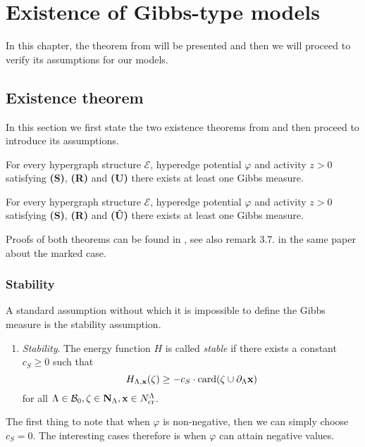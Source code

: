 \chapter{Existence of Gibbs-type models}\label{ch:3}
In this chapter, the theorem from \cite{DDG12} will be presented and then we will proceed to verify its assumptions for our models.

\section{Existence theorem}
In this section we first state the two existence theorems from \cite{DDG12} and then proceed to introduce its assumptions.

\begin{theorem}
	For every hypergraph structure $\mathcal E$, hyperedge potential $\varphi$ and activity $z>0$ satisfying \textbf{(S)}, \textbf{(R)} and \textbf{(U)} there exists at least one Gibbs measure.
\end{theorem}

\begin{theorem}
	For every hypergraph structure $\mathcal E$, hyperedge potential $\varphi$ and activity $z>0$ satisfying \textbf{(S)}, \textbf{(R)} and \textbf{(\^{U})} there exists at least one Gibbs measure.
\end{theorem}

Proofs of both theorems can be found in \cite{DDG12}, see also remark 3.7. in the same paper about the marked case.

\subsection{Stability}
A standard assumption without which it is impossible to define the Gibbs measure is the stability assumption. 

\begin{enumerate}[\textbf{(S)}] 
	\item \textit{Stability}. The energy function $H$ is called \textit{stable} if there exists a constant $c_S \geq 0$ such that 
		$$H_{\Lambda,{\mathbf{x}}}(\zeta) \geq -c_S \cdot \mathrm{card}(\zeta \cup \partial_\Lambda {\mathbf{x}})$$
for all $\Lambda \in \mathcal B_0, \zeta \in \mathbf N_\Lambda, {\mathbf{x}} \in N^\Lambda_{\text{cr}}$.
\end{enumerate}


The first thing to note that when $\varphi$ is non-negative, then we can simply choose $c_S = 0$. The interesting cases therefore is when $\varphi$ can attain negative values.\newline

